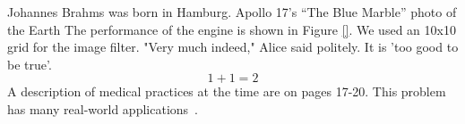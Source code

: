 Johannes Brahms was born in Hamburg.\cite{}
Apollo 17's ``The Blue Marble'' \cite{} photo of the Earth
The performance of the engine is shown in Figure \ref{}.
We used an 10x10 grid for the image filter.
"Very much indeed," Alice said politely.
It is 'too good to be true'.
$$ 1 + 1 = 2 $$
A description of medical practices at the time are on pages 17-20.
This problem has many real-world applications~\cite{A}\cite{B}.
